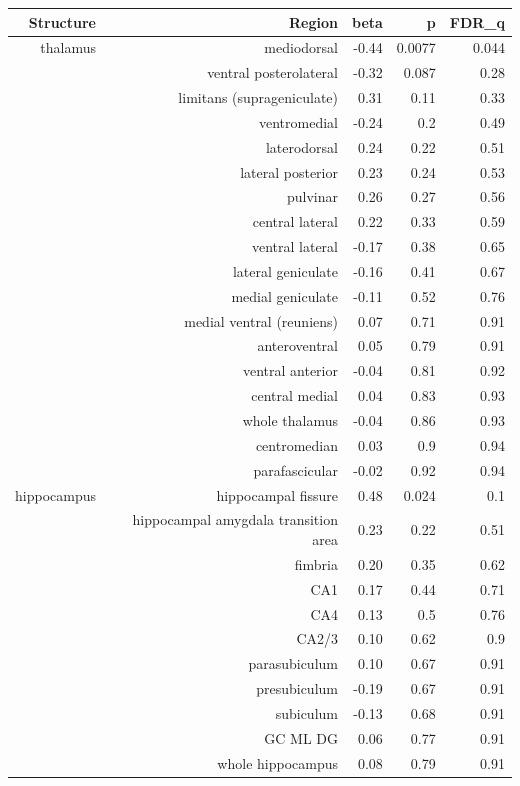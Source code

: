 \documentclass[
]{article}
\begin{document}
\begin{longtable}{rrrrr}
\toprule
Structure & Region & beta & p & FDR\_q \\ 
\midrule\addlinespace[2.5pt]
thalamus & mediodorsal & -0.44 & 0.0077 & 0.044 \\ 
 & ventral posterolateral & -0.32 & 0.087 & 0.28 \\ 
 & limitans (suprageniculate) & 0.31 & 0.11 & 0.33 \\ 
 & ventromedial & -0.24 & 0.2 & 0.49 \\ 
 & laterodorsal & 0.24 & 0.22 & 0.51 \\ 
 & lateral posterior & 0.23 & 0.24 & 0.53 \\ 
 & pulvinar & 0.26 & 0.27 & 0.56 \\ 
 & central lateral & 0.22 & 0.33 & 0.59 \\ 
 & ventral lateral & -0.17 & 0.38 & 0.65 \\ 
 & lateral geniculate & -0.16 & 0.41 & 0.67 \\ 
 & medial geniculate & -0.11 & 0.52 & 0.76 \\ 
 & medial ventral (reuniens) & 0.07 & 0.71 & 0.91 \\ 
 & anteroventral & 0.05 & 0.79 & 0.91 \\ 
 & ventral anterior & -0.04 & 0.81 & 0.92 \\ 
 & central medial & 0.04 & 0.83 & 0.93 \\ 
 &  whole thalamus & -0.04 & 0.86 & 0.93 \\ 
 & centromedian & 0.03 & 0.9 & 0.94 \\ 
 & parafascicular & -0.02 & 0.92 & 0.94 \\ 
hippocampus & hippocampal fissure & 0.48 & 0.024 & 0.1 \\ 
 & hippocampal amygdala transition area & 0.23 & 0.22 & 0.51 \\ 
 & fimbria & 0.20 & 0.35 & 0.62 \\ 
 & CA1 & 0.17 & 0.44 & 0.71 \\ 
 & CA4 & 0.13 & 0.5 & 0.76 \\ 
 & CA2/3 & 0.10 & 0.62 & 0.9 \\ 
 & parasubiculum & 0.10 & 0.67 & 0.91 \\ 
 & presubiculum & -0.19 & 0.67 & 0.91 \\ 
 & subiculum & -0.13 & 0.68 & 0.91 \\ 
 & GC ML DG & 0.06 & 0.77 & 0.91 \\ 
 & whole hippocampus & 0.08 & 0.79 & 0.91 \\ 

\end{longtable}
\end{document}
